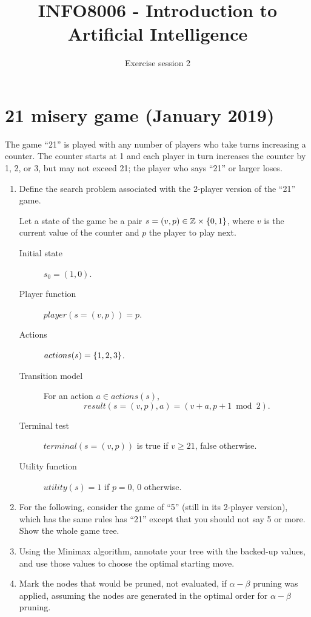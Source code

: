 \documentclass[11pt, a4paper]{article}
\title{INFO8006 - Introduction to Artificial Intelligence}
\subtitle{Exercise session 2}
\begin{document}
\maketitle

\newpage

\section{21 misery game (January 2019)}

The game \enquote{21} is played with any number of players who take turns increasing a counter. The counter starts at 1 and each player in turn increases the counter by 1, 2, or 3, but may not exceed 21; the player who says \enquote{21} or larger loses.

\begin{enumerate}
    \item Define the search problem associated with the 2-player version of the \enquote{21} game.

    \begin{solution}
        Let a state of the game be a pair $s = (v, p) \in \mathbb{Z} \times \{0, 1\}$, where $v$ is the current value of the counter and $p$ the player to play next.
        \begin{description}
            \item[Initial state] $s_0 = (1, 0)$.
            \item[Player function] $player(s = (v, p)) = p$.
            \item[Actions] $actions(s) = \{1, 2, 3\}$.
            \item[Transition model] For an action $a \in actions(s)$, $$result(s = (v, p), a) = (v + a,  p + 1 \bmod 2).$$
            \item[Terminal test] $terminal(s = (v, p))$ is true if $v \geq 21$, false otherwise.
            \item[Utility function] $utility(s) = 1$ if $p = 0$, $0$ otherwise.
        \end{description}
    \end{solution}

    \item For the following, consider the game of \enquote{5} (still in its 2-player version), which has the same rules has \enquote{21} except that you should not say 5 or more. Show the whole game tree.
    \item Using the Minimax algorithm, annotate your tree with the backed-up values, and use those values to choose the optimal starting move.
    \item Mark the nodes that would be pruned, \ie{} not evaluated, if $\alpha - \beta$ pruning was applied, assuming the nodes are generated in the optimal order for $\alpha - \beta$ pruning.


\end{enumerate}
\end{document}

